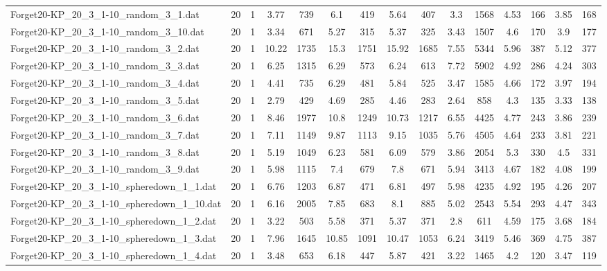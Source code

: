\begin{table}[!ht]
{\begin{tabular}{lcccccccccccccc}
Forget20-KP\_20\_3\_1-10\_random\_3\_1.dat & 20 & 1 & 3.77 & 739 & 6.1 & 419 & 5.64 & 407 & 3.3 & 1568 & 4.53 & 166 & 3.85 & 168 \\
Forget20-KP\_20\_3\_1-10\_random\_3\_10.dat & 20 & 1 & 3.34 & 671 & 5.27 & 315 & 5.37 & 325 & 3.43 & 1507 & 4.6 & 170 & 3.9 & 177 \\
Forget20-KP\_20\_3\_1-10\_random\_3\_2.dat & 20 & 1 & 10.22 & 1735 & 15.3 & 1751 & 15.92 & 1685 & 7.55 & 5344 & 5.96 & 387 & 5.12 & 377 \\
Forget20-KP\_20\_3\_1-10\_random\_3\_3.dat & 20 & 1 & 6.25 & 1315 & 6.29 & 573 & 6.24 & 613 & 7.72 & 5902 & 4.92 & 286 & 4.24 & 303 \\
Forget20-KP\_20\_3\_1-10\_random\_3\_4.dat & 20 & 1 & 4.41 & 735 & 6.29 & 481 & 5.84 & 525 & 3.47 & 1585 & 4.66 & 172 & 3.97 & 194 \\
Forget20-KP\_20\_3\_1-10\_random\_3\_5.dat & 20 & 1 & 2.79 & 429 & 4.69 & 285 & 4.46 & 283 & 2.64 & 858 & 4.3 & 135 & 3.33 & 138 \\
Forget20-KP\_20\_3\_1-10\_random\_3\_6.dat & 20 & 1 & 8.46 & 1977 & 10.8 & 1249 & 10.73 & 1217 & 6.55 & 4425 & 4.77 & 243 & 3.86 & 239 \\
Forget20-KP\_20\_3\_1-10\_random\_3\_7.dat & 20 & 1 & 7.11 & 1149 & 9.87 & 1113 & 9.15 & 1035 & 5.76 & 4505 & 4.64 & 233 & 3.81 & 221 \\
Forget20-KP\_20\_3\_1-10\_random\_3\_8.dat & 20 & 1 & 5.19 & 1049 & 6.23 & 581 & 6.09 & 579 & 3.86 & 2054 & 5.3 & 330 & 4.5 & 331 \\
Forget20-KP\_20\_3\_1-10\_random\_3\_9.dat & 20 & 1 & 5.98 & 1115 & 7.4 & 679 & 7.8 & 671 & 5.94 & 3413 & 4.67 & 182 & 4.08 & 199 \\
Forget20-KP\_20\_3\_1-10\_spheredown\_1\_1.dat & 20 & 1 & 6.76 & 1203 & 6.87 & 471 & 6.81 & 497 & 5.98 & 4235 & 4.92 & 195 & 4.26 & 207 \\
Forget20-KP\_20\_3\_1-10\_spheredown\_1\_10.dat & 20 & 1 & 6.16 & 2005 & 7.85 & 683 & 8.1 & 885 & 5.02 & 2543 & 5.54 & 293 & 4.47 & 343 \\
Forget20-KP\_20\_3\_1-10\_spheredown\_1\_2.dat & 20 & 1 & 3.22 & 503 & 5.58 & 371 & 5.37 & 371 & 2.8 & 611 & 4.59 & 175 & 3.68 & 184 \\
Forget20-KP\_20\_3\_1-10\_spheredown\_1\_3.dat & 20 & 1 & 7.96 & 1645 & 10.85 & 1091 & 10.47 & 1053 & 6.24 & 3419 & 5.46 & 369 & 4.75 & 387 \\
Forget20-KP\_20\_3\_1-10\_spheredown\_1\_4.dat & 20 & 1 & 3.48 & 653 & 6.18 & 447 & 5.87 & 421 & 3.22 & 1465 & 4.2 & 120 & 3.47 & 119 \\

\end{tabular}}
\end{table}
